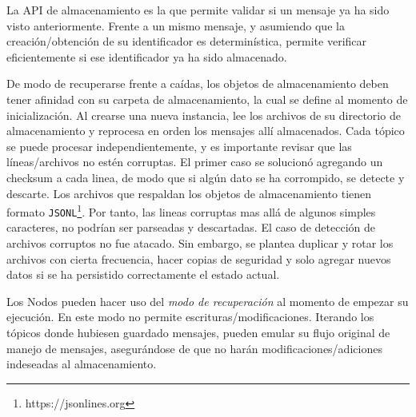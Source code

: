 \documentclass[titlepage,a4paper,oneside]{article}
\begin{document}
La API de almacenamiento es la que permite validar si un mensaje ya ha sido visto anteriormente. Frente a un mismo mensaje, y asumiendo que la creación/obtención de su identificador es determinística, permite verificar eficientemente si ese identificador ya ha sido almacenado.

De modo de recuperarse frente a caídas, los objetos de almacenamiento deben tener afinidad con su carpeta de almacenamiento, la cual se define al momento de inicialización. Al crearse una nueva instancia, lee los archivos de su directorio de almacenamiento y reprocesa en orden los mensajes allí almacenados. Cada tópico se puede procesar independientemente, y es importante revisar que las líneas/archivos no estén corruptas. El primer caso se solucionó agregando un checksum a cada linea, de modo que si algún dato se ha corrompido, se detecte y descarte. Los archivos que respaldan los objetos de almacenamiento tienen formato \texttt{JSONL}\footnote{https://jsonlines.org}. Por tanto, las lineas corruptas mas allá de algunos simples caracteres, no podrían ser parseadas y descartadas. El caso de detección de archivos corruptos no fue atacado. Sin embargo, se plantea duplicar y rotar los archivos con cierta frecuencia, hacer copias de seguridad y solo agregar nuevos datos si se ha persistido correctamente el estado actual.

Los Nodos pueden hacer uso del \textit{modo de recuperación} al momento de empezar su ejecución. En este modo no permite escrituras/modificaciones. Iterando los tópicos donde hubiesen guardado mensajes, pueden emular su flujo original de manejo de mensajes, asegurándose de que no harán modificaciones/adiciones indeseadas al almacenamiento.

\printbibliography
\end{document}
